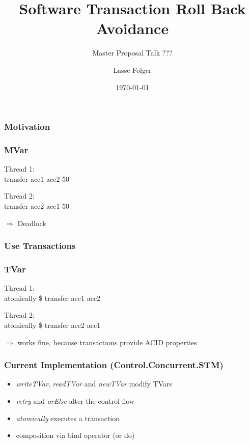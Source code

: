 \documentclass{beamer}
\author{Lasse Folger}
\title{\huge Software Transaction Roll Back Avoidance}
\subtitle{Master Proposal Talk ???}
\date{\today}
\begin{document}
  \begin{frame}[t,plain]
    \titlepage
  \end{frame}
  
  
  \begin{frame}[plain]
    \frametitle{Motivation}
    
  \end{frame}
  
  \begin{frame}
    \frametitle{MVar}
    \fboxsep=0pt
    \noindent
    \begin{minipage}[t]{0.48\linewidth}
      Thread 1:\\
      \vfill
      transfer acc1 acc2 50
    \end{minipage}%
    \hfill%
    \begin{minipage}[t]{0.48\linewidth}
      Thread 2:\\
      \vfill
      transfer acc2 acc1 50
    \end{minipage}
    \vfill
    \pause
    $\Rightarrow$ Deadlock
  \end{frame}
  
  \begin{frame}
    \frametitle{Use Transactions}
       
  \end{frame}
  
  \begin{frame}
    \frametitle{TVar}
    \fboxsep=0pt
    \noindent
    \begin{minipage}[t]{0.48\linewidth}
      Thread 1:\\
      \vfill
      atomically \$ 
      transfer acc1 acc2 
    \end{minipage}%
    \hfill%
    \begin{minipage}[t]{0.48\linewidth}
      Thread 2:\\
      \vfill
      atomically \$ transfer acc2 acc1
    \end{minipage}
    \vfill
    \pause
    $\Rightarrow$ works fine, because transactions provide ACID properties
  \end{frame}
  \begin{frame}
    \frametitle{Current Implementation (Control.Concurrent.STM)}
    \begin{itemize}\setlength\itemsep{1em}
      \item \textit{writeTVar}, \textit{readTVar} and \textit{newTVar} modify TVars
      \item \textit{retry} and \textit{orElse} alter the control flow
      \item \textit{atomically} executes a transaction 
      \item composition via bind operator (or do)
    \end{itemize}
  \end{frame}
\end{document}
